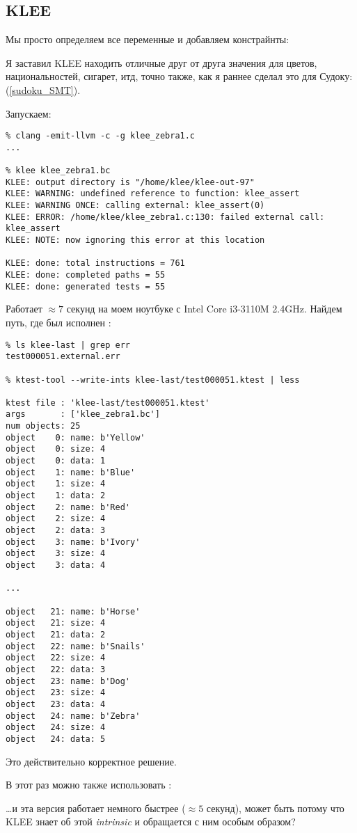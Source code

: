 \subsection{KLEE}

\renewcommand{\CURPATH}{puzzles/zebra/KLEE}

Мы просто определяем все переменные и добавляем констрайнты:



Я заставил KLEE находить отличные друг от друга значения для цветов, национальностей, сигарет, итд, точно также,
как я раннее сделал это для Судоку: (\ref{sudoku_SMT}).

Запускаем:

\begin{lstlisting}
% clang -emit-llvm -c -g klee_zebra1.c
...

% klee klee_zebra1.bc
KLEE: output directory is "/home/klee/klee-out-97"
KLEE: WARNING: undefined reference to function: klee_assert
KLEE: WARNING ONCE: calling external: klee_assert(0)
KLEE: ERROR: /home/klee/klee_zebra1.c:130: failed external call: klee_assert
KLEE: NOTE: now ignoring this error at this location

KLEE: done: total instructions = 761
KLEE: done: completed paths = 55
KLEE: done: generated tests = 55
\end{lstlisting}

Работает $\approx 7$ секунд на моем ноутбуке с Intel Core i3-3110M 2.4GHz.
Найдем путь, где был исполнен :

\begin{lstlisting}
% ls klee-last | grep err
test000051.external.err

% ktest-tool --write-ints klee-last/test000051.ktest | less

ktest file : 'klee-last/test000051.ktest'
args       : ['klee_zebra1.bc']
num objects: 25
object    0: name: b'Yellow'
object    0: size: 4
object    0: data: 1
object    1: name: b'Blue'
object    1: size: 4
object    1: data: 2
object    2: name: b'Red'
object    2: size: 4
object    2: data: 3
object    3: name: b'Ivory'
object    3: size: 4
object    3: data: 4

...

object   21: name: b'Horse'
object   21: size: 4
object   21: data: 2
object   22: name: b'Snails'
object   22: size: 4
object   22: data: 3
object   23: name: b'Dog'
object   23: size: 4
object   23: data: 4
object   24: name: b'Zebra'
object   24: size: 4
object   24: data: 5
\end{lstlisting}

Это действительно корректное решение.

В этот раз можно также использовать :



\dots и эта версия работает немного быстрее ($\approx 5$ секунд),
может быть потому что KLEE знает об этой \textit{intrinsic} и обращается с ним особым образом?

